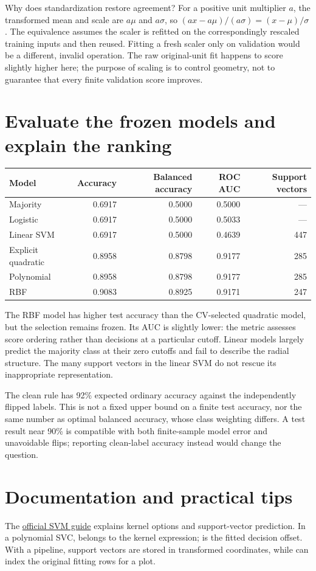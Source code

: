 Why does standardization restore agreement? For a positive unit multiplier $a$, the transformed mean and scale
are $a\mu$ and $a\sigma$, so $(ax-a\mu)/(a\sigma)=(x-\mu)/\sigma$.
The equivalence assumes the scaler is refitted on the correspondingly rescaled training inputs and then reused.
Fitting a fresh scaler only on validation would be a different, invalid operation.
The raw original-unit fit happens to score slightly higher here; the purpose of scaling is to control geometry,
not to guarantee that every finite validation score improves.

\section{Evaluate the frozen models and explain the ranking}
\begin{center}\begin{tabular}{lrrrr}\toprule
Model&Accuracy&Balanced accuracy&ROC AUC&Support vectors\\\midrule
Majority&0.6917&0.5000&0.5000&---\\
Logistic&0.6917&0.5000&0.5033&---\\
Linear SVM&0.6917&0.5000&0.4639&447\\
Explicit quadratic&0.8958&0.8798&0.9177&285\\
Polynomial&0.8958&0.8798&0.9177&285\\
RBF&0.9083&0.8925&0.9171&247\\\bottomrule\end{tabular}\end{center}
The RBF model has higher test accuracy than the CV-selected quadratic model, but the selection remains frozen.
Its AUC is slightly lower: the metric assesses score ordering rather than decisions at a particular cutoff.
Linear models largely predict the majority class at their zero cutoffs and fail to describe the radial structure.
The many support vectors in the linear SVM do not rescue its inappropriate representation.

The clean rule has 92\% expected ordinary accuracy against the independently flipped labels. This is not a
fixed upper bound on a finite test accuracy, nor the same number as optimal balanced accuracy, whose class
weighting differs. A test result near 90\% is compatible with both finite-sample model error and unavoidable
flips; reporting clean-label accuracy instead would change the question.

\newpage
\section*{Documentation and practical tips}
The \href{https://scikit-learn.org/1.8/modules/svm.html}{official SVM guide} explains kernel options and
support-vector prediction. In a polynomial SVC,  belongs to the kernel expression; 
is the fitted decision offset. With a pipeline, support vectors are stored in transformed coordinates,
while  can index the original fitting rows for a plot.

